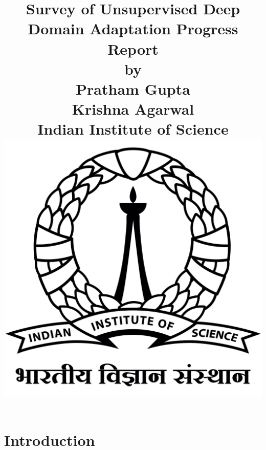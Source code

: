 \documentclass[12pt,a4paper,oneside]{book}
\title{
\sc
\Huge{Survey of Unsupervised Deep Domain Adaptation Progress Report}
\\[40pt]
\normalsize{by}
\\[15pt]
\large{Pratham Gupta \\
       Krishna Agarwal}
\\[15pt]
\normalsize{Indian Institute of Science}
\\[40pt]
\includegraphics[scale=0.04]{iisc_logo.jpg}
\\[40pt]
}
\author{}
\date{}
\begin{document}
\singlespacing
\begin{titlepage}
\maketitle
\end{titlepage}
\onehalfspacing
\frontmatter


{\hypersetup{linkcolor=black} \tableofcontents}
\mainmatter
 


\chapter{Introduction}
\end{document}
